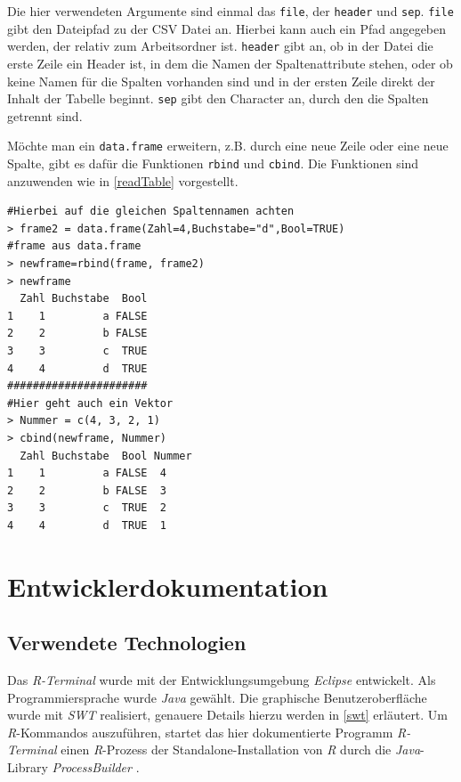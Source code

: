 \documentclass[a4paper, 12pt]{report} %
\begin{document}
Die hier verwendeten Argumente sind einmal das \texttt{file}, der \texttt{header} und \texttt{sep}. \texttt{file} gibt den Dateipfad zu der CSV Datei an. Hierbei kann auch ein Pfad angegeben werden, der relativ zum Arbeitsordner ist. \texttt{header} gibt an, ob in der Datei die erste Zeile ein Header ist, in dem die Namen der Spaltenattribute stehen, oder ob keine Namen für die Spalten vorhanden sind und in der ersten Zeile direkt der Inhalt der Tabelle beginnt. \texttt{sep} gibt den Character an, durch den die Spalten getrennt sind. 

Möchte man ein \texttt{data.frame} erweitern, z.B. durch eine neue Zeile oder eine neue Spalte, gibt es dafür die Funktionen \texttt{rbind} und \texttt{cbind}. Die Funktionen sind anzuwenden wie in \ref{readTable} vorgestellt. 

\lstset{language=R}
\begin{lstlisting}[frame=single,caption={\texttt{rbind} und \texttt{cbind}}]
#Hierbei auf die gleichen Spaltennamen achten
> frame2 = data.frame(Zahl=4,Buchstabe="d",Bool=TRUE)
#frame aus data.frame
> newframe=rbind(frame, frame2)		
> newframe
  Zahl Buchstabe  Bool
1    1         a FALSE
2    2         b FALSE
3    3         c  TRUE
4    4         d  TRUE
######################
#Hier geht auch ein Vektor
> Nummer = c(4, 3, 2, 1)
> cbind(newframe, Nummer)
  Zahl Buchstabe  Bool Nummer
1    1         a FALSE  4
2    2         b FALSE  3
3    3         c  TRUE  2
4    4         d  TRUE  1

\end{lstlisting}
\label{readTable}



\newpage

\chapter{Entwicklerdokumentation}

\section{Verwendete Technologien}

Das \textit{R-Terminal} wurde mit der Entwicklungsumgebung \textit{Eclipse} \cite{eclipse} entwickelt.
Als Programmiersprache wurde \textit{Java} \cite{java} gewählt. Die graphische Benutzeroberfläche wurde mit \textit{SWT} \cite{swt} realisiert, genauere Details hierzu werden in \ref{swt} erläutert.
Um \textit{R}-Kommandos auszuführen, startet das hier dokumentierte Programm \textit{R-Terminal} einen \textit{R}-Prozess der Standalone-Installation von \textit{R} durch die \textit{Java}-Library \textit{ProcessBuilder} \cite{processBuilder}.
\end{document}
